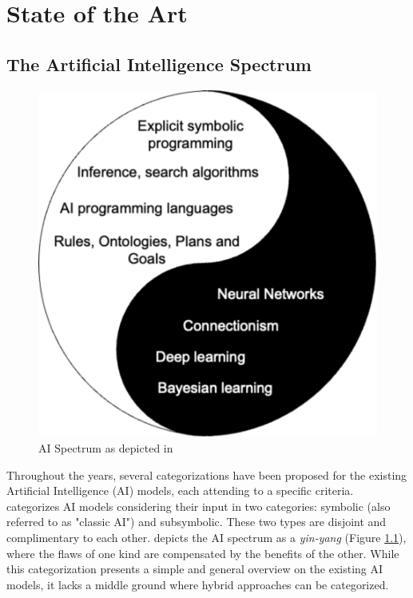 \chapter{State of the Art}
\label{chap:soa}

\section{The Artificial Intelligence Spectrum}

\begin{figure}
    \centering
    \includegraphics[width=.5\linewidth]{3_stateoftheart/figures/Lieberman_taxonomy.eps}
    \caption{AI Spectrum as depicted in \citep{lieberman_symbolic_nodate}}
    \label{fig:lieberman_tax}
\end{figure}

Throughout the years, several categorizations have been proposed for the existing Artificial Intelligence (AI) models, each attending to a specific criteria. \citep{lieberman_symbolic_nodate} categorizes AI models considering their input in two categories: symbolic (also referred to as "classic AI") and subsymbolic. These two types are disjoint and complimentary to each other. \citep{lieberman_symbolic_nodate} depicts the AI spectrum as a \textit{yin-yang} (Figure \ref{fig:lieberman_tax}), where the flaws of one kind are compensated by the benefits of the other. While this categorization presents a simple and general overview on the existing AI models, it lacks a middle ground where hybrid approaches can be categorized. 

